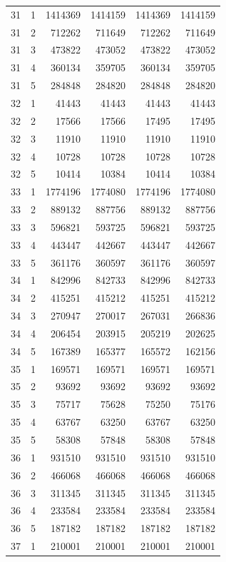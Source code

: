 \begin{longtable}{rrrrrr}
31 & 1 & 1414369 & 1414159 & 1414369 & 1414159 \\
31 & 2 & 712262 & 711649 & 712262 & 711649 \\
31 & 3 & 473822 & 473052 & 473822 & 473052 \\
31 & 4 & 360134 & 359705 & 360134 & 359705 \\
31 & 5 & 284848 & 284820 & 284848 & 284820 \\
32 & 1 & 41443 & 41443 & 41443 & 41443 \\
32 & 2 & 17566 & 17566 & 17495 & 17495 \\
32 & 3 & 11910 & 11910 & 11910 & 11910 \\
32 & 4 & 10728 & 10728 & 10728 & 10728 \\
32 & 5 & 10414 & 10384 & 10414 & 10384 \\
33 & 1 & 1774196 & 1774080 & 1774196 & 1774080 \\
33 & 2 & 889132 & 887756 & 889132 & 887756 \\
33 & 3 & 596821 & 593725 & 596821 & 593725 \\
33 & 4 & 443447 & 442667 & 443447 & 442667 \\
33 & 5 & 361176 & 360597 & 361176 & 360597 \\
34 & 1 & 842996 & 842733 & 842996 & 842733 \\
34 & 2 & 415251 & 415212 & 415251 & 415212 \\
34 & 3 & 270947 & 270017 & 267031 & 266836 \\
34 & 4 & 206454 & 203915 & 205219 & 202625 \\
34 & 5 & 167389 & 165377 & 165572 & 162156 \\
35 & 1 & 169571 & 169571 & 169571 & 169571 \\
35 & 2 & 93692 & 93692 & 93692 & 93692 \\
35 & 3 & 75717 & 75628 & 75250 & 75176 \\
35 & 4 & 63767 & 63250 & 63767 & 63250 \\
35 & 5 & 58308 & 57848 & 58308 & 57848 \\
36 & 1 & 931510 & 931510 & 931510 & 931510 \\
36 & 2 & 466068 & 466068 & 466068 & 466068 \\
36 & 3 & 311345 & 311345 & 311345 & 311345 \\
36 & 4 & 233584 & 233584 & 233584 & 233584 \\
36 & 5 & 187182 & 187182 & 187182 & 187182 \\
37 & 1 & 210001 & 210001 & 210001 & 210001 \\

\end{longtable}
